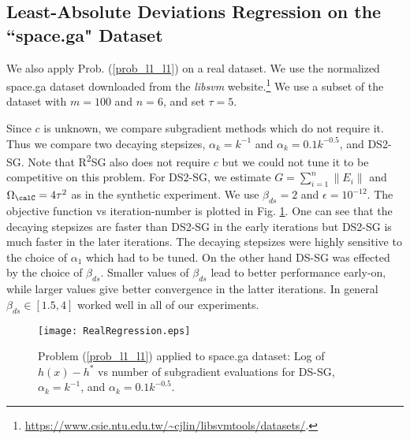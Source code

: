 \subsection{Least-Absolute Deviations Regression on the ``space.ga" Dataset}

We also apply Prob. (\ref{prob_l1_l1}) on a real dataset. We use the normalized space.ga dataset downloaded from the \emph{libsvm} website.\footnote{\url{https://www.csie.ntu.edu.tw/~cjlin/libsvmtools/datasets/}.} We use a subset of the dataset with $m=100$ and $n=6$, and set $\tau=5$.

Since $c$ is unknown, we compare subgradient methods which do not require it. Thus we compare two decaying stepsizes, $\alpha_k= k^{-1}$ and $\alpha_k=0.1 k^{-0.5}$, and DS2-SG. Note that  R\textsuperscript{2}SG also does not require $c$ but we could not tune it to be competitive on this problem. For DS2-SG, we estimate $G=\sum_{i=1}^n \|E_i\|$ and $\Omega_{\calC}=4\tau^2$ as in the synthetic experiment. We use $\beta_{ds}=2$ and $\epsilon=10^{-12}$. The objective function vs iteration-number is plotted in Fig. \ref{fig_realRegress}. One can see that the decaying stepsizes are faster than DS2-SG in the early iterations but DS2-SG is much faster in the later iterations. The decaying stepsizes were highly sensitive to the choice of $\alpha_1$ which had to be tuned. On the other hand DS-SG was effected by the choice of $\beta_{ds}$. Smaller values of $\beta_{ds}$ lead to better performance early-on, while larger values give better convergence in the latter iterations. In general $\beta_{ds}\in[1.5,4]$ worked well in all of our experiments. 

\begin{figure}
\centering
\texttt{[image: RealRegression.eps]}
\caption{Problem (\ref{prob_l1_l1}) applied to space.ga dataset: Log of $h(x)-h^*$  vs number of subgradient evaluations for DS-SG, $\alpha_k=k^{-1}$, and $\alpha_k=0.1 k^{-0.5}$.}
\label{fig_realRegress}
\end{figure}

